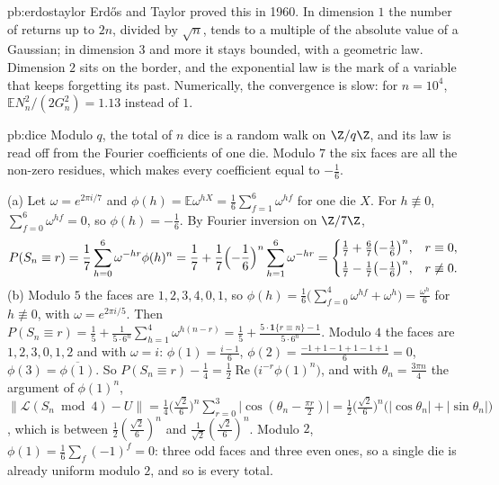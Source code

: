 \begin{solution}{pb:erdostaylor}
\leads Erdős and Taylor proved this in 1960. In dimension $1$ the number of returns up to $2n$, divided by $\sqrt n$, tends to a multiple of the absolute value of a Gaussian; in dimension
$3$ and more it stays bounded, with a geometric law. Dimension $2$ sits on the border, and the exponential law is the mark of a variable that keeps forgetting its past.
Numerically, the convergence is slow: for $n=10^4$, $\mathbb EN_n^2/(2G_n^2)=1.13$ instead of $1$.
\end{solution}

\begin{solution}{pb:dice}
\idea Modulo $q$, the total of $n$ dice is a random walk on $\Z/q\Z$, and its law is read off from the Fourier coefficients of one die. Modulo $7$ the six faces are all
the non-zero residues, which makes every coefficient equal to $-\frac16$.

\writeup (a) Let $\omega=e^{2\pi i/7}$ and $\phi(h)=\mathbb E\omega^{hX}=\frac16\sum_{f=1}^6\omega^{hf}$ for one die $X$. For $h\not\equiv0$, $\sum_{f=0}^6\omega^{hf}=0$, so
$\phi(h)=-\frac16$. By Fourier inversion on $\Z/7\Z$,
\[
P(S_n\equiv r)=\frac17\sum_{h=0}^6\omega^{-hr}\phi(h)^n=\frac17+\frac17\Bigl(-\frac16\Bigr)^n\sum_{h=1}^6\omega^{-hr}
=\begin{cases}\frac17+\frac67\bigl(-\frac16\bigr)^n,& r\equiv0,\\[2pt] \frac17-\frac17\bigl(-\frac16\bigr)^n,& r\not\equiv0.\end{cases}
\]
(b) Modulo $5$ the faces are $1,2,3,4,0,1$, so $\phi(h)=\frac16\bigl(\sum_{f=0}^4\omega^{hf}+\omega^h\bigr)=\frac{\omega^h}6$ for $h\not\equiv0$, with $\omega=e^{2\pi i/5}$. Then
$P(S_n\equiv r)=\frac15+\frac1{5\cdot6^n}\sum_{h=1}^4\omega^{h(n-r)}=\frac15+\frac{5\cdot\mathbf 1\{r\equiv n\}-1}{5\cdot6^n}$. Modulo $4$ the faces are $1,2,3,0,1,2$ and with
$\omega=i$: $\phi(1)=\frac{i-1}6$, $\phi(2)=\frac{-1+1-1+1-1+1}6=0$, $\phi(3)=\overline{\phi(1)}$. So
$P(S_n\equiv r)-\frac14=\frac12\operatorname{Re}\bigl(i^{-r}\phi(1)^n\bigr)$, and with $\theta_n=\frac{3\pi n}4$ the argument of $\phi(1)^n$,
$\|\mathcal L(S_n\bmod4)-U\|=\frac14\bigl(\frac{\sqrt2}6\bigr)^n\sum_{r=0}^3\bigl|\cos(\theta_n-\frac{\pi r}2)\bigr|=\frac12\bigl(\frac{\sqrt2}6\bigr)^n\bigl(|\cos\theta_n|+|\sin\theta_n|\bigr)$,
which is between $\frac12(\frac{\sqrt2}6)^n$ and $\frac1{\sqrt2}(\frac{\sqrt2}6)^n$. Modulo $2$, $\phi(1)=\frac16\sum_f(-1)^f=0$: three odd faces and three even ones, so a single die is
already uniform modulo $2$, and so is every total.


\end{solution}
